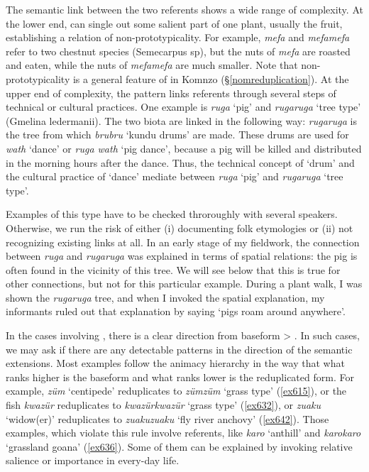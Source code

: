 The semantic link between the two referents shows a wide range of complexity. At the lower end,  can single out some salient part of one plant, usually the fruit, establishing a relation of non-prototypicality. For example, \emph{mefa} and \emph{mefamefa} refer to two chestnut species (Semecarpus sp), but the nuts of \emph{mefa} are roasted and eaten, while the nuts of \emph{mefamefa} are much smaller. Note that non-prototypicality is a general feature of  in Komnzo (\S{}\ref{nomreduplication}). At the upper end of complexity, the  pattern links referents through several steps of technical or cultural practices. One example is \emph{ruga} `pig' and \emph{rugaruga} `tree type' (Gmelina ledermanii). The two biota are linked in the following way: \emph{rugaruga} is the tree from which \emph{brubru} `kundu drums' are made. These drums are used for \emph{wath} `dance' or \emph{ruga wath} `pig dance', because a pig will be killed and distributed in the morning hours after the dance. Thus, the technical concept of `drum' and the cultural practice of `dance' mediate between \emph{ruga} `pig' and \emph{rugaruga} `tree type'.%

Examples of this type have to be checked throroughly with several speakers. Otherwise, we run the risk of either (i) documenting folk etymologies or (ii) not recognizing existing links at all. In an early stage of my fieldwork, the connection between \emph{ruga} and \emph{rugaruga} was explained in terms of spatial relations: the pig is often found in the vicinity of this tree. We will see below that this is true for other connections, but not for this particular example. During a plant walk, I was shown the \emph{rugaruga} tree, and when I invoked the spatial explanation, my informants ruled out that explanation by saying `pigs roam around anywhere'.%

In the cases involving , there is a clear direction from baseform > . In such cases, we may ask if there are any detectable patterns in the direction of the semantic extensions. Most examples follow the animacy hierarchy in the way that what ranks higher is the baseform and what ranks lower is the reduplicated form. For example, \emph{züm} `centipede' reduplicates to \emph{zümzüm} `grass type' (\ref{ex615}), or the fish \emph{kwazür} reduplicates to \emph{kwazürkwazür} `grass type' (\ref{ex632}), or \emph{zuaku} `widow(er)' reduplicates to \emph{zuakuzuaku} `fly river anchovy' (\ref{ex642}). Those examples, which violate this rule involve  referents, like \emph{karo} `anthill' and \emph{karokaro} `grassland goana' (\ref{ex636}). Some of them can be explained by invoking relative salience or importance in every-day life.%


